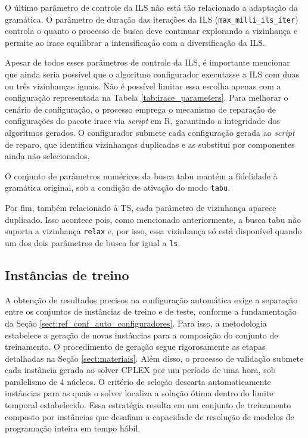 O último parâmetro de controle da \ac{ILS} não está tão relacionado a adaptação da gramática. O parâmetro de duração das iterações da \ac{ILS} (\texttt{max\_milli\_ils\_iter}) controla o quanto o processo de busca deve continuar explorando a vizinhança e permite ao irace equilibrar a intensificação com a diversificação da \ac{ILS}.

Apesar de todos esses parâmetros de controle da \ac{ILS}, é importante mencionar que ainda seria possível que o algoritmo configurador executasse a \ac{ILS} com duas ou três vizinhanças iguais. Não é possível limitar essa escolha apenas com a configuração representada na Tabela \ref{tab:irace_parameters}. Para melhorar o cenário de configuração, o processo emprega o mecanismo de reparação de configurações do pacote irace via \textit{script} em R, garantindo a integridade dos algoritmos gerados. O configurador submete cada configuração gerada ao \textit{script} de reparo, que identifica vizinhanças duplicadas e as substitui por componentes ainda não selecionados. 

O conjunto de parâmetros numéricos da busca tabu mantém a fidelidade à gramática original, sob a condição de ativação do modo \texttt{tabu}.

Por fim, também relacionado à \ac{TS}, cada parâmetro de vizinhança aparece duplicado. Isso acontece pois, como mencionado anteriormente, a busca tabu não suporta a vizinhança \texttt{relax} e, por isso, essa vizinhança só está disponível quando um dos dois parâmetros de busca for igual a \texttt{ls}.

\subsection{Instâncias de treino}

A obtenção de resultados precisos na configuração automática exige a separação entre os conjuntos de instâncias de treino e de teste, conforme a fundamentação da Seção \ref{sect:ref_conf_auto_configuradores}. Para isso, a metodologia estabelece a geração de novas instâncias para a composição do conjunto de treinamento. O procedimento de geração segue rigorosamente as etapas detalhadas na Seção \ref{sect:materiais}. Além disso, o processo de validação submete cada instância gerada ao solver CPLEX por um período de uma hora, sob paralelismo de 4 núcleos. O critério de seleção descarta automaticamente instâncias para as quais o solver localiza a solução ótima dentro do limite temporal estabelecido. Essa estratégia resulta em um conjunto de treinamento composto por instâncias que desafiam a capacidade de resolução de modelos de programação inteira em tempo hábil.

